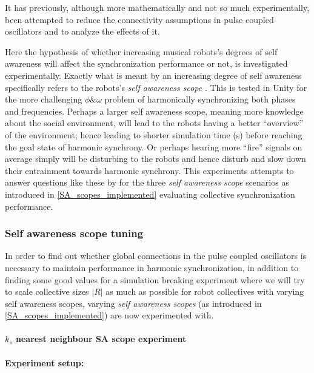	It has previously, although more mathematically and not so much experimentally, been attempted to reduce the connectivity assumptions in pulse coupled oscillators \cite{minimally_connected_pcos} and to analyze the effects of it.
	
	Here the hypothesis of whether increasing musical robots's degrees of self awareness will affect the synchronization performance or not, is investigated experimentally. Exactly what is meant by an increasing degree of self awareness specifically refers to the robots's \textit{self awareness scope} \cite{sacs17_ch3}. This is tested in Unity for the more challenging $\phi \& \omega$ problem of harmonically synchronizing both phases and frequencies. Perhaps a larger self awareness scope, meaning more knowledge about the social environment, will lead to the robots having a better ``overview'' of the environment; hence leading to shorter simulation time (s) before reaching the goal state of harmonic synchrony. Or perhaps hearing more ``fire'' signals on average simply will be disturbing to the robots and hence disturb and slow down their entrainment towards harmonic synchrony. This experiments attempts to answer questions like these by for the three \textit{self awareness scope} scenarios as introduced in \ref{SA_scopes_implemented} evaluating collective synchronization performance.
	
	
		\subsubsection{Self awareness scope tuning}
		\label{phase_sync_SA_scopes_tuning}

		In order to find out whether global connections in the pulse coupled oscillators is necessary to maintain performance in harmonic synchronization, in addition to finding some good values for a simulation breaking experiment where we will try to scale collective sizes $|R|$ as much as possible for robot collectives with varying self awareness scopes, varying \textit{self awareness scopes} (as introduced in \ref{SA_scopes_implemented}) are now experimented with.
		
		
		
			\paragraph{$k_s$ nearest neighbour SA scope experiment}
			
				\paragraph{Experiment setup:\nl}
				
